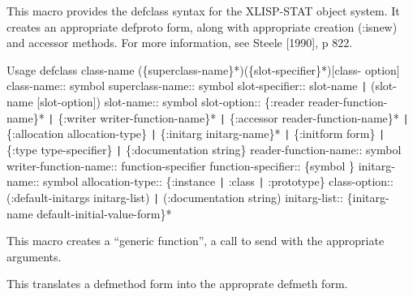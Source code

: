 
\hfuzz=5pt


\beginDefinition


\beginDocumentation
This macro provides the defclass syntax for the XLISP-STAT object
system.  It creates an appropriate defproto form, along with
appropriate creation (:isnew) and accessor methods.  For more
information, see Steele [1990], p 822.

    Usage
    defclass class-name (\{superclass-name\}*)(\{slot-specifier\}*)[class-
      option]
    class-name:: symbol
    superclass-name:: symbol
    slot-specifier:: slot-name {\tt|} (slot-name [slot-option])
    slot-name:: symbol
    slot-option::
     \{:reader reader-function-name\}* {\tt|}
     \{:writer writer-function-name\}* {\tt|}
     \{:accessor reader-function-name\}* {\tt|}
     \{:allocation allocation-type\} {\tt|}
     \{:initarg initarg-name\}* {\tt|}
     \{:initform form\} {\tt|}
     \{:type type-specifier\} {\tt|}
     \{:documentation string\}
    reader-function-name:: symbol
    writer-function-name:: function-specifier
    function-specifier:: \{symbol \}
    initarg-name:: symbol
    allocation-type:: \{:instance {\tt|} :class {\tt|} :prototype\}
    class-option::
     (:default-initargs initarg-list) {\tt|}
     (:documentation string) 
    initarg-list:: \{initarg-name default-initial-value-form\}*
\endDocumentation
{}\endUsage

\endDefinition


\beginDefinition


\beginDocumentation
This macro creates a ``generic function'', a call to send with the
appropriate arguments.\endDocumentation
{}\endUsage

\endDefinition


\beginDefinition


\beginDocumentation
This translates a defmethod form into the approprate defmeth form.\endDocumentation
{}\endUsage

\endDefinition


